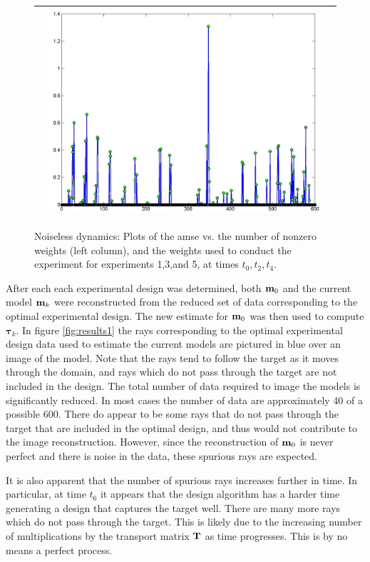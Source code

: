 \documentclass[11pt]{article}
\newcommand{\bfT}	{{\bf{T}}}
\newcommand{\bfm}	{{\bf{m}}}
\newcommand{\bftau}      {{\boldsymbol \tau}}
\begin{document}
\begin{figure}[!h]
\begin{center}
\begin{tabular}{|c|c|c|}
			&
			\includegraphics[width=.8\iwidth]{figures/newFigs/exp5Weights}\\			
			\hline
		\end{tabular}
	\end{center}
	\caption{Noiseless dynamics: Plots of the {\sf amse} vs. the number of nonzero weights (left column), and the weights used to conduct the experiment for experiments 1,3,and 5, at times $t_0,t_2,t_4$.}
	\label{fig:weights1}
\end{figure}

After each each experimental design was determined, both $\bfm_0$ and the current model $\bfm_k$ were reconstructed from the reduced set of data corresponding to the optimal experimental design. The new estimate for $\bfm_0$ was then used to compute $\bftau_k$. In figure \ref{fig:results1} the rays corresponding to the optimal experimental design data used to estimate the current models are pictured in blue over an image of the model. Note that the rays tend to follow the target as it moves through the domain, and rays which do not pass through the target are not included in the design.  The total number of data required to image the models is significantly reduced. In most cases the number of data are approximately 40 of a possible 600. There do appear to be some rays that do not pass through the target that are included in the optimal design, and thus would not contribute to the image reconstruction. However, since the reconstruction of $\bfm_0$ is never perfect and there is noise in the data, these spurious rays are expected. 

It is also apparent that the number of spurious rays increases further in time. In particular, at time $t_6$ it appears that the design algorithm has a harder time generating a design that captures the target well. There are many more rays which do not pass through the target. This is likely due to the increasing number of multiplications by the transport matrix $\bfT$ as time progresses. This is by no means a perfect process.
\end{document}
